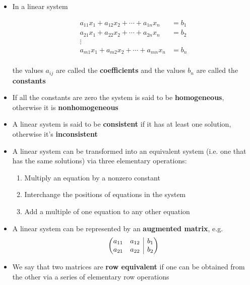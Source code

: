 \documentclass{article}
\makeatletter
\newenvironment{amatrix}[1]{%
  \left(\begin{array}{@{}*{#1}{c}|c@{}}
    }{%
  \end{array}\right)
}
\makeatother
\begin{document}
\begin{itemize}
  \item In a linear system

        \begin{align*}
          a_{11} x_1 + a_{12} x_2 + \cdots + a_{1n} x_n & = b_1 \\
          a_{21} x_1 + a_{22} x_2 + \cdots + a_{2n} x_n & = b_2 \\
          \vdots                                                \\
          a_{m1} x_1 + a_{m2} x_2 + \cdots + a_{mn} x_n & = b_n \\
        \end{align*}

        the values $a_{ij}$ are called the \textbf{coefficients} and the values $b_n$ are called the \textbf{constants}

  \item If all the constants are zero the system is said to be \textbf{homogeneous}, otherwise it is \textbf{nonhomogeneous}

  \item A linear system is said to be \textbf{consistent} if it has at least one solution, otherwise it's \textbf{inconsistent}

  \item A linear system can be transformed into an equivalent system (i.e. one that has the same solutions) via three elementary operations:

        \begin{enumerate}
          \item Multiply an equation by a nonzero constant

          \item Interchange the positions of equations in the system

          \item Add a multiple of one equation to any other equation
        \end{enumerate}

  \item A linear system can be represented by an \textbf{augmented matrix}, e.g. \[\begin{amatrix}{2}
            a_{11} & a_{12} & b_1 \\
            a_{21} & a_{22} & b_2
          \end{amatrix}\]

  \item We say that two matrices are \textbf{row equivalent} if one can be obtained from the other via a series of elementary row operations


\end{itemize}
\end{document}

